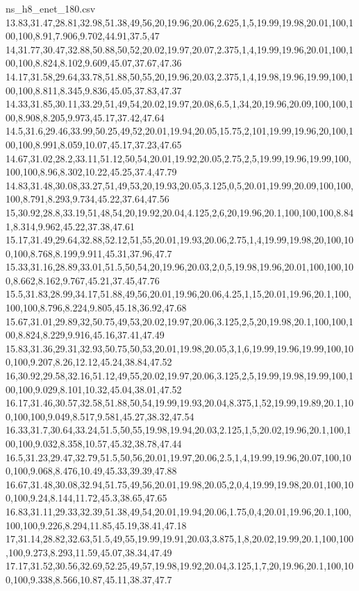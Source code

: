 \begin{filecontents*}[overwrite]{ns_h8_enet_180.csv}
13.83,31.47,28.81,32.98,51.38,49,56,20,19.96,20.06,2.625,1,5,19.99,19.98,20.01,100,100,100,8.91,7.906,9.702,44.91,37.5,47
14,31.77,30.47,32.88,50.88,50,52,20.02,19.97,20.07,2.375,1,4,19.99,19.96,20.01,100,100,100,8.824,8.102,9.609,45.07,37.67,47.36
14.17,31.58,29.64,33.78,51.88,50,55,20,19.96,20.03,2.375,1,4,19.98,19.96,19.99,100,100,100,8.811,8.345,9.836,45.05,37.83,47.37
14.33,31.85,30.11,33.29,51,49,54,20.02,19.97,20.08,6.5,1,34,20,19.96,20.09,100,100,100,8.908,8.205,9.973,45.17,37.42,47.64
14.5,31.6,29.46,33.99,50.25,49,52,20.01,19.94,20.05,15.75,2,101,19.99,19.96,20,100,100,100,8.991,8.059,10.07,45.17,37.23,47.65
14.67,31.02,28.2,33.11,51.12,50,54,20.01,19.92,20.05,2.75,2,5,19.99,19.96,19.99,100,100,100,8.96,8.302,10.22,45.25,37.4,47.79
14.83,31.48,30.08,33.27,51,49,53,20,19.93,20.05,3.125,0,5,20.01,19.99,20.09,100,100,100,8.791,8.293,9.734,45.22,37.64,47.56
15,30.92,28.8,33.19,51,48,54,20,19.92,20.04,4.125,2,6,20,19.96,20.1,100,100,100,8.841,8.314,9.962,45.22,37.38,47.61
15.17,31.49,29.64,32.88,52.12,51,55,20.01,19.93,20.06,2.75,1,4,19.99,19.98,20,100,100,100,8.768,8.199,9.911,45.31,37.96,47.7
15.33,31.16,28.89,33.01,51.5,50,54,20,19.96,20.03,2,0,5,19.98,19.96,20.01,100,100,100,8.662,8.162,9.767,45.21,37.45,47.76
15.5,31.83,28.99,34.17,51.88,49,56,20.01,19.96,20.06,4.25,1,15,20.01,19.96,20.1,100,100,100,8.796,8.224,9.805,45.18,36.92,47.68
15.67,31.01,29.89,32,50.75,49,53,20.02,19.97,20.06,3.125,2,5,20,19.98,20.1,100,100,100,8.824,8.229,9.916,45.16,37.41,47.49
15.83,31.36,29.31,32.93,50.75,50,53,20.01,19.98,20.05,3,1,6,19.99,19.96,19.99,100,100,100,9.207,8.26,12.12,45.24,38.84,47.52
16,30.92,29.58,32.16,51.12,49,55,20.02,19.97,20.06,3.125,2,5,19.99,19.98,19.99,100,100,100,9.029,8.101,10.32,45.04,38.01,47.52
16.17,31.46,30.57,32.58,51.88,50,54,19.99,19.93,20.04,8.375,1,52,19.99,19.89,20.1,100,100,100,9.049,8.517,9.581,45.27,38.32,47.54
16.33,31.7,30.64,33.24,51.5,50,55,19.98,19.94,20.03,2.125,1,5,20.02,19.96,20.1,100,100,100,9.032,8.358,10.57,45.32,38.78,47.44
16.5,31.23,29.47,32.79,51.5,50,56,20.01,19.97,20.06,2.5,1,4,19.99,19.96,20.07,100,100,100,9.068,8.476,10.49,45.33,39.39,47.88
16.67,31.48,30.08,32.94,51.75,49,56,20.01,19.98,20.05,2,0,4,19.99,19.98,20.01,100,100,100,9.24,8.144,11.72,45.3,38.65,47.65
16.83,31.11,29.33,32.39,51.38,49,54,20.01,19.94,20.06,1.75,0,4,20.01,19.96,20.1,100,100,100,9.226,8.294,11.85,45.19,38.41,47.18
17,31.14,28.82,32.63,51.5,49,55,19.99,19.91,20.03,3.875,1,8,20.02,19.99,20.1,100,100,100,9.273,8.293,11.59,45.07,38.34,47.49
17.17,31.52,30.56,32.69,52.25,49,57,19.98,19.92,20.04,3.125,1,7,20,19.96,20.1,100,100,100,9.338,8.566,10.87,45.11,38.37,47.7

\end{filecontents*}
